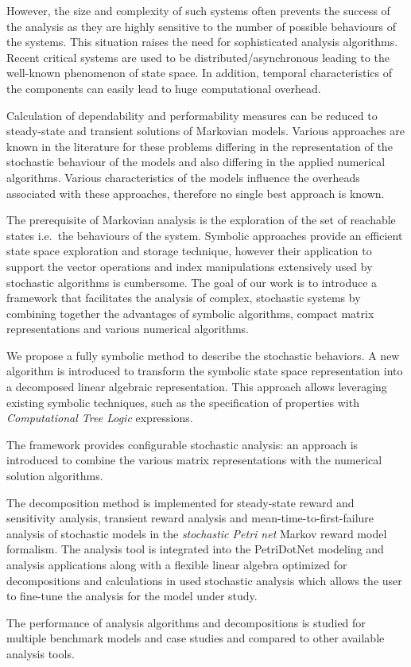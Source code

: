 However, the size and complexity of such systems often prevents the success of the analysis as they are highly
sensitive to the number of possible behaviours of the systems. This situation raises the need for
sophisticated analysis algorithms. Recent critical systems are used to be distributed/asynchronous leading to
the well-known phenomenon of state space. In addition, temporal
characteristics of the components can easily lead to huge
computational overhead.

Calculation of dependability and performability measures can be
reduced to steady-state and transient solutions of Markovian
models. Various approaches are known in the literature for these
problems differing in the representation of the stochastic behaviour
of the models and also differing in the applied numerical
algorithms. Various characteristics of the models influence the
overheads associated with these approaches, therefore no single best
approach is known.

The prerequisite of Markovian analysis is the exploration of the set
of reachable states i.e.~the behaviours of the system. Symbolic
approaches provide an efficient state space exploration and storage
technique, however their application to support the vector operations
and index manipulations extensively used by stochastic algorithms is
cumbersome.  The goal of our work is to introduce a framework that
facilitates the analysis of complex, stochastic systems by combining together the advantages of symbolic algorithms, compact matrix representations and various numerical algorithms.

We propose a fully symbolic method to describe the stochastic behaviors. A new algorithm is introduced to transform the symbolic
state space representation into a decomposed linear algebraic
representation. This approach allows leveraging existing symbolic
techniques, such as the specification of
properties with \emph{Computational Tree Logic} 
expressions.

The framework provides configurable stochastic analysis: an approach is introduced to combine the various matrix representations with the numerical solution algorithms. 

The decomposition method is implemented for steady-state reward and
sensitivity analysis, transient reward analysis and
mean-time-to-first-failure analysis of stochastic models in the
\emph{stochastic Petri net}  Markov reward model
formalism. The analysis tool is integrated into the PetriDotNet
modeling and analysis applications along with a flexible linear
algebra optimized for decompositions and calculations in used
stochastic analysis which allows the user to fine-tune the analysis
for the model under study.

The performance of analysis algorithms and decompositions is studied
for multiple benchmark models and case studies and compared to other
available analysis tools.
